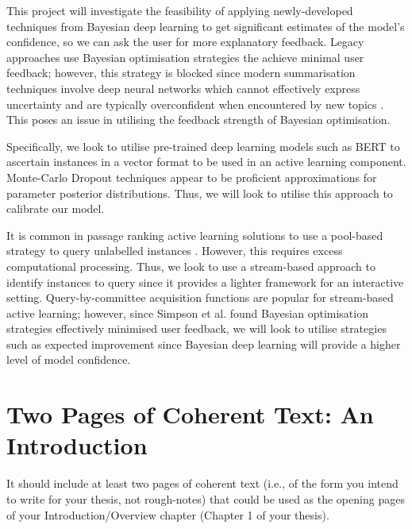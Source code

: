 \documentclass[ %
                    author={James Stephenson},
                supervisor={Dr. Edwin Simpson},
                    degree={MSc},
                     title={Project Plan: Bayesian Deep Learning For Extractive Test Summarisation},
                  subtitle={},
                      type={},
                      year={2022}]{../additions/dissertation}
\begin{document}
		\medbreak	
		This project will investigate the feasibility of applying newly-developed techniques from Bayesian deep learning \cite{Wilson20} to get significant estimates of the model's confidence, so we can ask the user for more explanatory feedback. Legacy approaches use Bayesian optimisation \cite{Simpson19} strategies the achieve minimal user feedback; however, this strategy is blocked since modern summarisation techniques involve deep neural networks which cannot effectively express uncertainty and are typically overconfident when encountered by new topics \cite{Xu19}. This poses an issue in utilising the feedback strength of Bayesian optimisation.

		\medbreak		
		Specifically, we look to utilise pre-trained deep learning models such as BERT to ascertain instances in a vector format to be used in an active learning component. Monte-Carlo Dropout \cite{Gal15} techniques appear to be proficient approximations for parameter posterior distributions. Thus, we will look to utilise this approach to calibrate our model.

		\medbreak
		It is common in passage ranking active learning solutions to use a pool-based strategy to query unlabelled instances \cite{EinDor20}. However, this requires excess computational processing. Thus, we look to use a stream-based approach to identify instances to query since it provides a lighter framework for an interactive setting. Query-by-committee acquisition functions are popular for stream-based active learning; however, since Simpson et al. \cite{Simpson19} found Bayesian optimisation strategies effectively minimised user feedback, we will look to utilise strategies such as expected improvement since Bayesian deep learning will provide a higher level of model confidence. 

		
		
	
	\mainmatter
	
	 
	\chapter{Two Pages of Coherent Text: An Introduction}
	\label{chap:introduction}
		
		It should include at least two pages of coherent text (i.e., of the form you intend to write for your thesis, not rough-notes) that could be used as the opening pages of your Introduction/Overview chapter (Chapter 1 of your thesis). 
		
\end{document}
